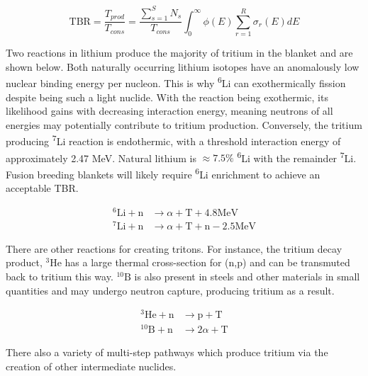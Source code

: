 \begin{equation}
  \label{eq:tbr}
  \mathrm{TBR} = \frac{T_{prod}}{T_{cons}} = \frac{\sum_{s=1}^{S} N_{s}}{T_{cons}} \int_{0}^{\infty} \phi(E) \sum_{r=1}^{R} \sigma_{r}(E) dE
\end{equation}

Two reactions in lithium produce the majority of tritium in the blanket and are shown below. Both naturally occurring lithium isotopes have an anomalously low nuclear binding energy per nucleon. This is why \textsuperscript{6}Li can exothermically fission despite being such a light nuclide. With the reaction being exothermic, its likelihood gains with decreasing interaction energy, meaning neutrons of all energies may potentially contribute to tritium production. Conversely, the tritium producing \textsuperscript{7}Li reaction is endothermic, with a threshold interaction energy of approximately 2.47 MeV. Natural lithium is $\approx 7.5\%$ \textsuperscript{6}Li with the remainder \textsuperscript{7}Li. Fusion breeding blankets will likely require \textsuperscript{6}Li enrichment to achieve an acceptable TBR.

\begin{equation}
\begin{split}
  ^{6}\mathrm{Li} + \mathrm{n} & \rightarrow \alpha + \mathrm{T} + 4.8\mathrm{MeV} \\
  ^{7}\mathrm{Li} + \mathrm{n} & \rightarrow \alpha + \mathrm{T} + \mathrm{n} - 2.5\mathrm{MeV}
\end{split}
\end{equation}

There are other reactions for creating tritons. For instance, the tritium decay product, $^{3}\mathrm{He}$ has a large thermal cross-section for (n,p) and can be transmuted back to tritium this way. $^{10}\mathrm{B}$ is also present in steels and other materials in small quantities and may undergo neutron capture, producing tritium as a result.

\begin{equation}
\begin{split}
  ^{3}\mathrm{He} + \mathrm{n} & \rightarrow \mathrm{p} + \mathrm{T} \\
  ^{10}\mathrm{B} + \mathrm{n} & \rightarrow 2\alpha + \mathrm{T}
\end{split}
\end{equation}

There also a variety of multi-step pathways which produce tritium via the creation of other intermediate nuclides. 

